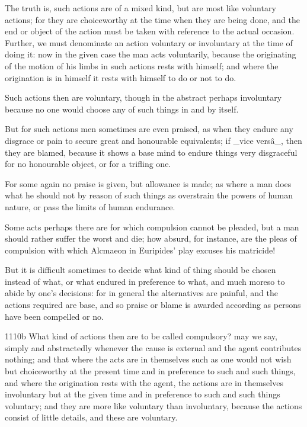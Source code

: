The truth is, such actions are of a mixed kind, but are most like
voluntary actions; for they are choiceworthy at the time when they are
being done, and the end or object of the action must be taken with
reference to the actual occasion. Further, we must denominate an action
voluntary or involuntary at the time of doing it: now in the given case
the man acts voluntarily, because the originating of the motion of his
limbs in such actions rests with himself; and where the origination is
in himself it rests with himself to do or not to do.

Such actions then are voluntary, though in the abstract perhaps
involuntary because no one would choose any of such things in and by
itself.

But for such actions men sometimes are even praised, as when they endure
any disgrace or pain to secure great and honourable equivalents; if
_vice versâ_, then they are blamed, because it shows a base mind to
endure things very disgraceful for no honourable object, or for a
trifling one.

For some again no praise is given, but allowance is made; as where a
man does what he should not by reason of such things as overstrain the
powers of human nature, or pass the limits of human endurance.

Some acts perhaps there are for which compulsion cannot be pleaded, but
a man should rather suffer the worst and die; how absurd, for instance,
are the pleas of compulsion with which Alcmaeon in Euripides' play
excuses his matricide!

But it is difficult sometimes to decide what kind of thing should be
chosen instead of what, or what endured in preference to what, and much
moreso to abide by one's decisions: for in general the alternatives are
painful, and the actions required are base, and so praise or blame is
awarded according as persons have been compelled or no.

1110b What kind of actions then are to be called compulsory? may we say,
simply and abstractedly whenever the cause is external and the agent
contributes nothing; and that where the acts are in themselves such
as one would not wish but choiceworthy at the present time and in
preference to such and such things, and where the origination rests with
the agent, the actions are in themselves involuntary but at the given
time and in preference to such and such things voluntary; and they are
more like voluntary than involuntary, because the actions consist of
little details, and these are voluntary.

